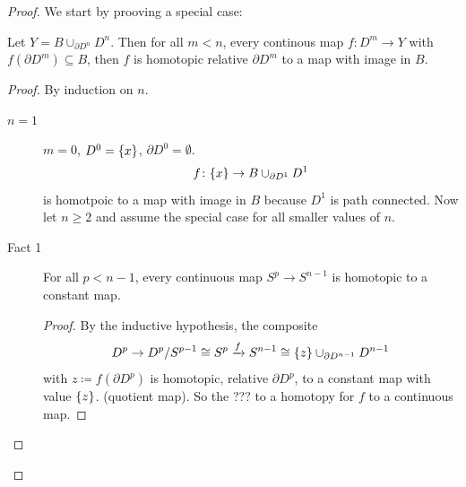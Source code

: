 \documentclass{TemplateLecture}
\begin{document}
\begin{proof}
    We start by prooving a special case:
    \begin{thm}{}{}
        Let \(Y = B\cup _{\partial D^n} D^n\). Then for all \(m < n\), every continous map \(f \colon D^m \to Y\) with \(f(\partial D^m) \subseteq B\),
        then \(f\) is homotopic relative \(\partial D^m\) to a map with image in \(B\).
    \end{thm}
    \begin{proof}
        By induction on \(n\).
        \begin{description}
            \item[\(n = 1\)] \(m = 0\), \(D^0 = \{x\}\), \(\partial D^0 = \emptyset\).
            \[f\colon \{x\} \to B\cup_{\partial D^1} D^1\]
            is homotpoic to a map with image in \(B\) because \(D^1\) is path connected.
            Now let \(n \geq 2\) and assume the special case for all smaller values of \(n\).
        \end{description}
        \begin{description}
            \item[Fact 1] For all \(p < n-1\), every continuous map \(S^p \to S^{n-1}\) is homotopic to a constant map.
            \begin{proof}
                By the inductive hypothesis, the composite
                \[D^p \to D^p/S^{p-1} \cong S^{p} \xrightarrow{f} S^{n-1} \cong \{z\} \cup_{\partial D^{n-1}} D^{n-1}\]
                with \(z\coloneq f(\partial D^p)\) is homotopic, relative \(\partial D^p\), to a constant map with value \(\{z\}\). (quotient map).
                So the ??? to a homotopy for \(f\) to a continuous map.
            \end{proof}


\end{description}
\end{proof}
\end{proof}
\end{document}
